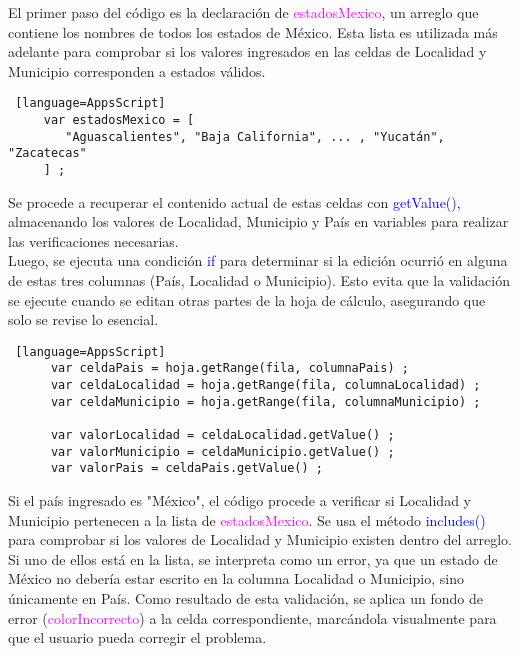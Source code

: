 \documentclass[12pt]{article} %
\begin{document}
    El primer paso del código es la declaración de \textcolor{magenta}{estadosMexico}, un arreglo que contiene los nombres de todos los estados de México. Esta lista es utilizada más adelante para comprobar si los valores ingresados en las celdas de Localidad y Municipio corresponden a estados válidos. \\
     
    \begin{lstlisting} [language=AppsScript]
     var estadosMexico = [
        "Aguascalientes", "Baja California", ... , "Yucatán", "Zacatecas"
     ] ;
    \end{lstlisting}

    Se procede a recuperar el contenido actual de estas celdas con \textcolor{blue}{getValue()}, almacenando los valores de Localidad, Municipio y País en variables para realizar las verificaciones necesarias. \\
    
    Luego, se ejecuta una condición \textcolor{blue}{if} para determinar si la edición ocurrió en alguna de estas tres columnas (País, Localidad o Municipio). Esto evita que la validación se ejecute cuando se editan otras partes de la hoja de cálculo, asegurando que solo se revise lo esencial. \\
    
    \begin{lstlisting} [language=AppsScript]
      var celdaPais = hoja.getRange(fila, columnaPais) ;
      var celdaLocalidad = hoja.getRange(fila, columnaLocalidad) ;
      var celdaMunicipio = hoja.getRange(fila, columnaMunicipio) ;
    
      var valorLocalidad = celdaLocalidad.getValue() ;
      var valorMunicipio = celdaMunicipio.getValue() ;
      var valorPais = celdaPais.getValue() ;
    \end{lstlisting}

    Si el país ingresado es "México", el código procede a verificar si Localidad y Municipio pertenecen a la lista de \textcolor{magenta}{estadosMexico}. Se usa el método \textcolor{blue}{includes()} para comprobar si los valores de Localidad y Municipio existen dentro del arreglo.  \\
    
    Si uno de ellos está en la lista, se interpreta como un error, ya que un estado de México no debería estar escrito en la columna Localidad o Municipio, sino únicamente en País. Como resultado de esta validación, se aplica un fondo de error (\textcolor{magenta}{colorIncorrecto}) a la celda correspondiente, marcándola visualmente para que el usuario pueda corregir el problema.  \\
    
\end{document}
